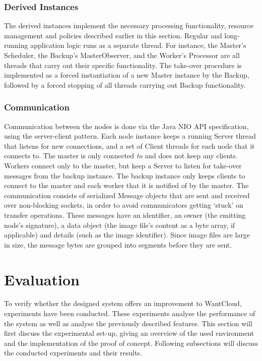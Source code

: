 \documentclass{acm_proc_article-sp}
\begin{document}
\subsubsection{Derived Instances}
The derived instances implement the necessary processing functionality, resource management and policies described earlier in this section.
Regular and long-running application logic runs as a separate thread. 
For instance, the Master's Scheduler, the Backup's MasterObserver, and the Worker's Processor are all threads that carry out their specific functionality. 
The take-over procedure is implemented as a forced instantiation of a new Master instance by the Backup, followed by a forced stopping of all threads carrying out Backup functionality.

\subsubsection{Communication}
Communication between the nodes is done via the Java NIO API\cite{web:nio} specification, using the server-client pattern. 
Each node instance keeps a running Server thread that listens for new connections, and a set of Client threads for each node that it connects to.
 The master is only connected \emph{to} and does not keep any clients. 
Workers connect only to the master, but keep a Server to listen for take-over messages from the backup instance. 
The backup instance only keeps clients to connect to the master and each worker that it is notified of by the master. 
The communication consists of serialized Message objects that are sent and received over non-blocking sockets, in order to avoid communicators getting \lq{}stuck\rq{} on transfer operations. 
These messages have an identifier, an owner (the emitting node's signature), a data object (the image file's content as a byte array, if applicable) and details (such as the image identifier). 
Since image files are large in size, the message bytes are grouped into segments before they are sent.

\section{Evaluation}
\label{sec:eval}
To verify whether the designed system offers an improvement to WantCloud, experiments have been conducted.
These experiments analyse the performance of the system as well as analyse the previously described features.
This section will first discuss the experimental set-up, giving an overview of the used environment and the implementation of the proof of concept.
Following subsections will discuss the conducted experiments and their results.
\end{document}
